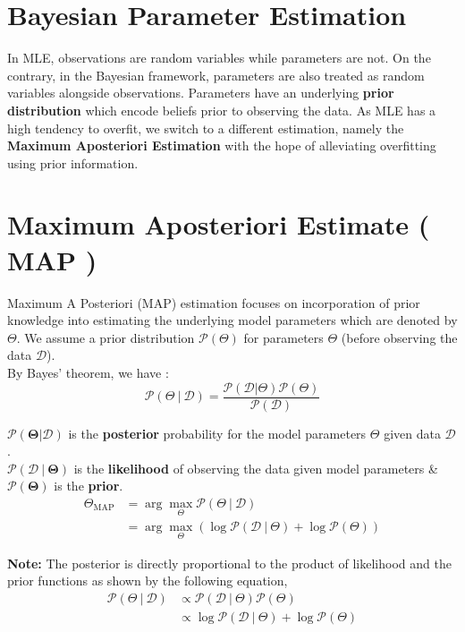 \documentclass{report}
\newcommand{\Pb}{\mathcal{P}}
\newcommand{\D}{\mathcal{D}}
\begin{document}
\section{Bayesian Parameter Estimation}
In MLE, observations are random variables while parameters are not. On the contrary, in the Bayesian framework, parameters are also treated as random variables alongside observations. Parameters have an underlying \textbf{prior distribution} which encode beliefs prior to observing the data. As MLE has a high tendency to overfit, we switch to a different estimation, namely the \textbf{Maximum Aposteriori Estimation} with the hope of alleviating overfitting using prior information.

\section{Maximum Aposteriori Estimate ( MAP )}

Maximum A Posteriori (MAP) estimation focuses on incorporation of prior knowledge into estimating the underlying model parameters which are denoted by $\Theta$. We assume a prior distribution $\Pb(\Theta)$ for parameters $\Theta$ (before observing the data $\D$). \\

By Bayes' theorem, we have :
$$
  \Pb(\Theta \ | \ \D) = \frac{\Pb(\D|\Theta)\Pb(\Theta)}{\Pb(\D)}
$$

$\bm{\Pb(\Theta|\D)}$ is the \textbf{posterior} probability for the model parameters $\Theta$ given data $\D$. \\
$\bm{\Pb(\D \ | \ \Theta)}$ is the \textbf{likelihood} of observing the data given model parameters \& $\bm{\Pb(\Theta)}$ is the \textbf{prior}.
\begin{align*}
  \Theta_{\text{MAP}} & = \arg \max\limits_{\Theta} \Pb(\Theta \ | \ \D)                             \\
                      & = \arg \max\limits_{\Theta} ( \log \Pb(\D \ | \ \Theta) + \log \Pb(\Theta) )
\end{align*}

\textbf{Note:} The posterior is directly proportional to the product of likelihood and the prior functions as shown by the following equation,
\begin{align*}
  \Pb(\Theta \ | \ \D) & \propto  \Pb(\D \ | \ \Theta)  \Pb(\Theta)           \\
                       & \propto \log \Pb(\D \ | \ \Theta) + \log \Pb(\Theta)
\end{align*}
\end{document}
